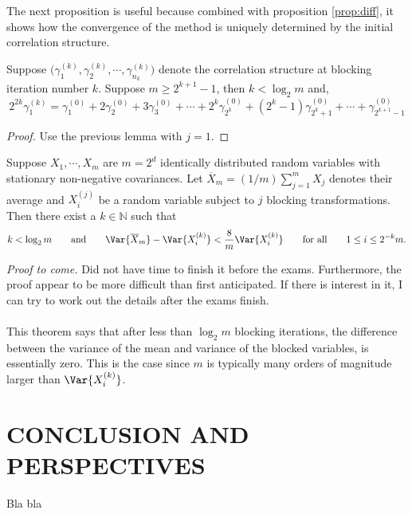 \documentclass[11pt,english,a4paper]{article}
\begin{document}
The next proposition is useful because combined with proposition \ref{prop:diff}, it shows how the convergence of the method is uniquely determined by the initial correlation structure.
\begin{prop}
Suppose $\big(\gamma_1^{(k)} , \gamma_2^{(k)}, \cdots, \gamma_{n_k}^{(k)}\big)$ denote the correlation structure at blocking iteration number $k$. Suppose $m \geq 2^{k+1} - 1$, then $k < \log_2 m$ and,
\[
2^{  2k} \gamma_1^{(k)} = \gamma_1^{(0)} + 2\gamma_2^{(0)} + 3 \gamma_3^{(0)} + \cdots +2^k \gamma_{2^k}^{(0)} + (2^k-1)\gamma_{2^k+1}^{(0)} + \cdots + \gamma_{2^{k+1}-1}^{(0)}
\] \label{prop:sequence}
\end{prop}
\begin{proof}
Use the previous lemma with $j=1$.
\end{proof}
\begin{theorem}
Suppose $X_1,\cdots, X_m$ are $m = 2^d$ identically distributed random variables with stationary non-negative covariances. Let $\overline X_m = (1/m)\sum_{j=1}^m X_j$ denotes their average and $X^{(j)}_i$ be a random variable subject to $j$ blocking transformations. Then there exist a $k \in \mathbb{N}$ such that 
\[
k < \log_2 m \qquad \text{and} \qquad \Var{\overline X_m} - \Var{X^{(k)}_i} < \frac{8}{m}\Var{X^{(k)}_i} \qquad \text{for all} \qquad 1 \leq i \leq 2^{-k}m.
\]
\end{theorem}
\textit{Proof to come.} Did not have time to finish it before the exams. Furthermore, the proof appear to be more difficult than first anticipated. If there is interest in it, I can try to work out the details after the exams finish.\\
\\
This theorem says that after less than $\log_2 m$ blocking iterations, the difference between the variance of the mean and variance of the blocked variables, is essentially zero. This is the case since $m$ is typically many orders of magnitude larger than $\Var{X^{(k)}_i}$.
\section*{\uppercase{Conclusion and perspectives}}
Bla bla
\end{document}
